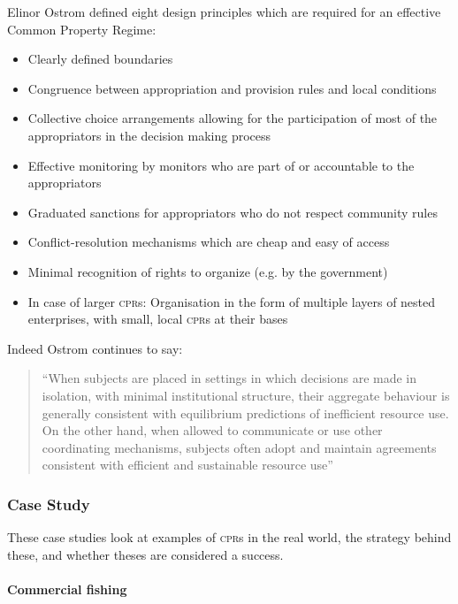 Elinor Ostrom defined eight design principles which are required for an effective Common Property Regime:~\cite{Ostrom-90}

\begin{itemize}
	\item Clearly defined boundaries
	\item Congruence between appropriation and provision rules and local conditions
	\item Collective choice arrangements allowing for the participation of most of the appropriators in the decision making process
	\item Effective monitoring by monitors who are part of or accountable to the appropriators
	\item Graduated sanctions for appropriators who do not respect community rules
	\item Conflict-resolution mechanisms which are cheap and easy of access
	\item Minimal recognition of rights to organize (e.g. by the government)
	\item In case of larger \textsc{cpr}s: Organisation in the form of multiple layers of nested enterprises, with small, local \textsc{cpr}s at their bases
\end{itemize}

Indeed Ostrom continues to say:

\begin{quote}
	``When subjects are placed in settings in which decisions are made in isolation, with minimal institutional structure, their aggregate behaviour is generally consistent with equilibrium predictions of inefficient resource use. On the other hand, when allowed to communicate or use other coordinating mechanisms, subjects often adopt and maintain agreements consistent with efficient and sustainable resource use''~\cite{Ostrom-rules}
\end{quote}

\subsubsection{Case Study}

These case studies look at examples of \textsc{cpr}s in the real world, the strategy behind these, and whether theses are considered a success.

\paragraph{Commercial fishing}

